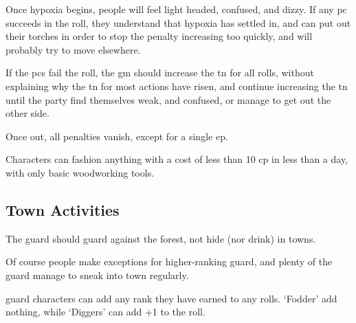 \begin{multicols}{2}
Once hypoxia begins, people will feel light headed, confused, and dizzy.
If any \gls{pc} succeeds in the roll, they understand that hypoxia has settled in, and can put out their torches in order to stop the penalty increasing too quickly, and will probably try to move elsewhere.

If the \glspl{pc} fail the roll, the \gls{gm} should increase the \gls{tn} for all rolls, without explaining why the \gls{tn} for most actions have risen, and continue increasing the \gls{tn} until the party find themselves weak, and confused, or manage to get out the other side.

Once out, all penalties vanish, except for a single \gls{ep}.

Characters can fashion anything with a cost of less than 10 \gls{cp} in less than a day, with only basic woodworking tools.

\subsection{Town Activities}

The \gls{guard} should guard against the forest, not hide (nor drink) in towns.

Of course people make exceptions for higher-ranking \gls{guard}, and plenty of the guard manage to sneak into town regularly.

\Gls{guard} characters can add any rank they have earned to any rolls.
`Fodder' add nothing, while `Diggers' can add +1 to the roll.

\end{multicols}
